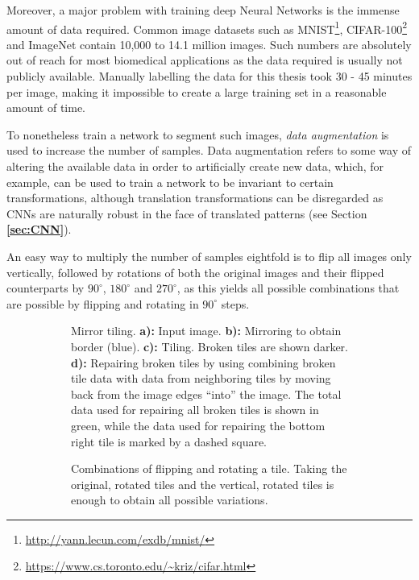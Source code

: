 \noindent Moreover, a major problem with training deep Neural Networks is the immense amount of data required. Common image datasets such as MNIST\footnote{\url{http://yann.lecun.com/exdb/mnist/}}, CIFAR-100\footnote{\url{https://www.cs.toronto.edu/~kriz/cifar.html}} and ImageNet \cite{ILSVRC} contain 10,000 to 14.1 million images. Such numbers are absolutely out of reach for most biomedical applications as the data required is usually not publicly available. Manually labelling the data for this thesis took 30 - 45 minutes per image, making it impossible to create a large training set in a reasonable amount of time.

To nonetheless train a network to segment such images, \textit{data augmentation} is used to increase the number of samples. Data augmentation refers to some way of altering the available data in order to artificially create new data, which, for example, can be used to train a network to be invariant to certain transformations, although translation transformations can be disregarded as CNNs are naturally robust in the face of translated patterns (see Section \textbf{\ref{sec:CNN}}).

An easy way to multiply the number of samples eightfold is to flip all images only vertically, followed by rotations of both the original images and their flipped counterparts by $90^{\circ}$, $180^{\circ}$ and $270^{\circ}$, as this yields all possible combinations that are possible by flipping and rotating in $90^{\circ}$ steps.\\


\begin {figure}[!ht]
	\begin {subfigure}[t]{0.5\linewidth}
		\scalebox{0.5}{}

		\caption*{Mirror tiling. \textbf{a):} Input image. \textbf{b):} Mirroring to obtain border (blue). \textbf{c):} Tiling. Broken tiles are shown darker. \textbf{d):} Repairing broken tiles by using combining broken tile data with data from neighboring tiles by moving back from the image edges ``into'' the image. The total data used for repairing all broken tiles is shown in green, while the data used for repairing the bottom right tile is marked by a dashed square.}
	\end {subfigure}
	\hspace{1cm}
	\begin {subfigure}[t]{0.5\linewidth}
		\scalebox{0.5}{}

		\caption*{Combinations of flipping and rotating a tile. Taking the original, rotated tiles and the vertical, rotated tiles is enough to obtain all possible variations.}
	\end {subfigure}

		\caption[Mirror tiling and rotating.]{}
		\label{fig:tile_mirror_rotate}

\end {figure}


